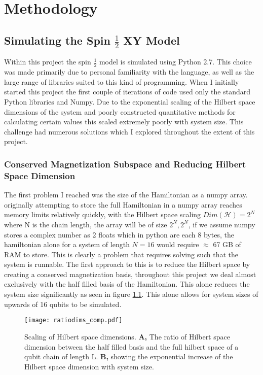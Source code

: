 \chapter{Methodology}

\section{Simulating the Spin $\frac {1} {2} $ XY Model }
Within this project the spin $\frac{1}{2}$ model is simulated using Python 2.7.
This choice was made primarily due to personal familiarity with the language, as well as the large range of libraries suited to this kind of programming. When I initially started this project the first couple of iterations of code used only the standard Python libraries and Numpy. Due to the exponential scaling of the Hilbert space dimensions of the system and poorly constructed quantitative methods for calculating certain values this scaled extremely poorly with system size. This challenge had numerous solutions which I explored throughout the extent of this project. 

\subsection{Conserved Magnetization Subspace and Reducing Hilbert Space Dimension}
The first problem I reached was the size of the Hamiltonian as a numpy array.
originally attempting to store the full Hamiltonian in a numpy array reaches memory limits relatively quickly, with the Hilbert space scaling $Dim(\mathcal{H}) = 2^N $ where N is the chain length, the array will be of size $2^N,2^N$, if we assume numpy stores a complex number as 2 floats which in python are each 8 bytes, the hamiltonian alone for a system of length $N=16$ would require $\approx$ 67 GB of RAM to store. This is clearly a problem that requires solving such that the system is runnable. 
The first approach to this is to reduce the Hilbert space by creating a conserved magnetization basis, throughout this project we deal almost exclusively with the half filled basis of the Hamiltonian. This alone reduces the system size significantly as seen in figure \ref{fig:fig_HilbertDims}. This alone allows for system sizes of upwards of 16 qubits to be simulated.\\
\begin{figure}
	\centering
	\texttt{[image: ratiodims\_comp.pdf]}
	\caption{Scaling of Hilbert space dimensions. \textbf{A,} The ratio of Hilbert space dimension between the half filled basis and the full hilbert space of a qubit chain of length L. \textbf{B,} showing the exponential increase of the Hilbert space dimension with system size.}
	\label{fig:fig_HilbertDims}
\end{figure}

